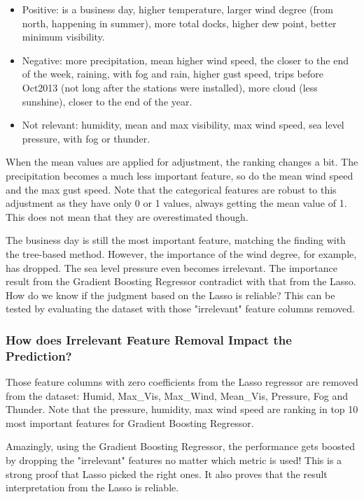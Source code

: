 \documentclass[a4paper]{article}
\begin{document}
			\begin{itemize}
				\item Positive: is a business day, higher temperature, larger wind degree (from north, happening in summer), more total docks, higher dew point, better minimum visibility.
				\item Negative: more precipitation, mean higher wind speed, the closer to the end of the week, raining, with fog and rain, higher gust speed, trips before Oct2013 (not long after the stations were installed), more cloud (less sunshine), closer to the end of the year.
				\item Not relevant: humidity, mean and max visibility, max wind speed, sea level pressure, with fog or thunder.
			\end{itemize}
			
			When the mean values are applied for adjustment, the ranking changes a bit. The precipitation becomes a much less important feature, so do the mean wind speed and the max gust speed. Note that the categorical features are robust to this adjustment as they have only 0 or 1 values, always getting the mean value of 1. This does not mean that they are overestimated though. 
			
			The business day is still the most important feature, matching the finding with the tree-based method. However, the importance of the wind degree, for example, has dropped. The sea level pressure even becomes irrelevant. The importance result from the Gradient Boosting Regressor contradict with that from the Lasso. How do we know if the judgment based on the Lasso is reliable? This can be tested by evaluating the dataset with those "irrelevant" feature columns removed.
			
			\subsubsection{How does Irrelevant Feature Removal Impact the Prediction?}
			
			Those feature columns with zero coefficients from the Lasso regressor are removed from the dataset: Humid, Max\_Vis, Max\_Wind, Mean\_Vis, Pressure, Fog and Thunder. Note that the pressure, humidity, max wind speed are ranking in top 10 most important features for Gradient Boosting Regressor.
			
			Amazingly, using the Gradient Boosting Regressor, the performance gets boosted by dropping the "irrelevant" features no matter which metric is used! This is a strong proof that Lasso picked the right ones. It also proves that the result interpretation from the Lasso is reliable.
\end{document}
